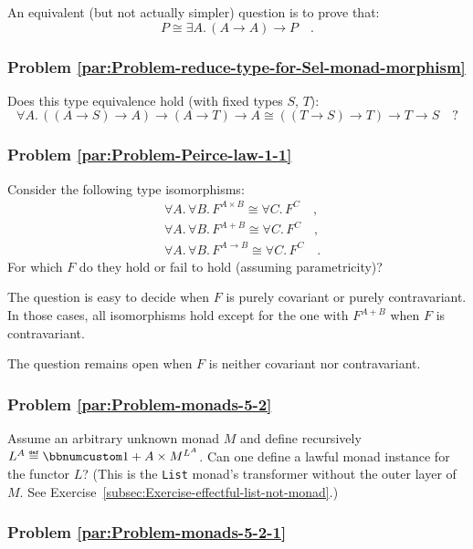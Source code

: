 An equivalent (but not actually simpler) question is to prove that:
\[
P\cong\exists A.\,(A\rightarrow A)\rightarrow P\quad.
\]


\subsubsection{Problem \label{par:Problem-reduce-type-for-Sel-monad-morphism}\ref{par:Problem-reduce-type-for-Sel-monad-morphism}}

Does this type equivalence hold (with fixed types $S$, $T$):
\[
\forall A.\,((A\rightarrow S)\rightarrow A)\rightarrow(A\rightarrow T)\rightarrow A\cong((T\rightarrow S)\rightarrow T)\rightarrow T\rightarrow S\quad?
\]
 

\subsubsection{Problem \label{par:Problem-Peirce-law-1-1}\ref{par:Problem-Peirce-law-1-1}}

Consider the following type isomorphisms:
\begin{align*}
 & \forall A.\,\forall B.\,F^{A\times B}\cong\forall C.\,F^{C}\quad,\\
 & \forall A.\,\forall B.\,F^{A+B}\cong\forall C.\,F^{C}\quad,\\
 & \forall A.\,\forall B.\,F^{A\rightarrow B}\cong\forall C.\,F^{C}\quad.
\end{align*}
For which $F$ do they hold or fail to hold (assuming parametricity)?

The question is easy to decide when $F$ is purely covariant or purely
contravariant. In those cases, all isomorphisms hold except for the
one with $F^{A+B}$ when $F$ is contravariant.

The question remains open when $F$ is neither covariant nor contravariant.

\subsubsection{Problem \label{par:Problem-monads-5-2}\ref{par:Problem-monads-5-2}}

Assume an arbitrary unknown monad $M$ and define recursively $L^{A}\triangleq\bbnum 1+A\times M^{L^{A}}$.
Can one define a lawful monad instance for the functor $L$? (This
is the \lstinline!List! monad\textsf{'}s transformer without the outer layer
of $M$. See Exercise~\ref{subsec:Exercise-effectful-list-not-monad}.)

\subsubsection{Problem \label{par:Problem-monads-5-2-1}\ref{par:Problem-monads-5-2-1}}

